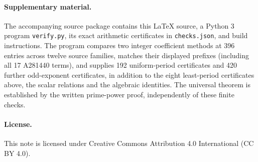 \documentclass[11pt]{article}
\begin{document}
\paragraph{Supplementary material.}
The accompanying source package contains this \LaTeX{} source, a Python 3
program \texttt{verify.py}, its exact arithmetic certificates in
\texttt{checks.json}, and build instructions. The program compares two
integer coefficient methods at 396 entries across twelve source families,
matches their displayed prefixes (including all 17 A281440 terms), and
supplies 192 uniform-period certificates and 420 further odd-exponent
certificates, in addition to the eight least-period certificates above,
the scalar relations and the algebraic identities.
The universal theorem is established by the written prime-power proof,
independently of these finite checks.

\paragraph{License.}
This note is licensed under Creative Commons Attribution 4.0 International
(CC BY 4.0).
\end{document}
